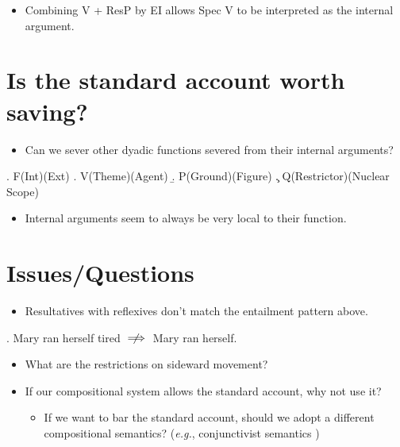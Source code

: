 \documentclass[letterpaper]{article}
\begin{document}
\begin{itemize}
  \item Combining V + ResP by EI allows Spec V to be interpreted as the internal argument.
\end{itemize}

\section{Is the standard account worth saving?}
\begin{itemize}
  \item Can we sever other dyadic functions severed from their internal arguments?
\end{itemize}
\ex. F(Int)(Ext)
\a. V(Theme)(Agent)
\b. P(Ground)(Figure)
\c. Q(Restrictor)(Nuclear Scope)

\begin{itemize}
  \item Internal arguments seem to always be very local to their function.
\end{itemize}

\section{Issues/Questions}
\begin{itemize}
  \item Resultatives with reflexives don't match the entailment pattern above.
\end{itemize}
\ex. Mary ran herself tired $\centernot\implies$ Mary ran herself.

\begin{itemize}
  \item What are the restrictions on sideward movement?
  \item If our compositional system allows the standard account, why not use it?
    \begin{itemize}
      \item If we want to bar the standard account, should we adopt a different compositional semantics? (\textit{e.g.},  conjunctivist semantics \parencite{pietroski2011minimal})
    \end{itemize}
\end{itemize}
\printbibliography
\end{document}
